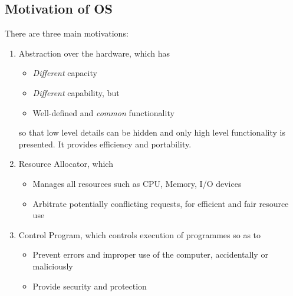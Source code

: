 \documentclass[11pt]{article}
\theoremstyle{definition}
\begin{document}
\subsection{Motivation of OS}
There are three main motivations:
\begin{enumerate}
  \item Abstraction over the hardware, which has
  \begin{itemize}[itemsep=0pt]
    \item \textit{Different} capacity
    \item \textit{Different} capability, but
    \item Well-defined and \textit{common} functionality
  \end{itemize}
  so that low level details can be hidden and only high level functionality is presented. It provides efficiency and portability.
  \item Resource Allocator, which 
  \begin{itemize}[itemsep=0pt]
    \item Manages all resources such as CPU, Memory, I/O devices
    \item Arbitrate potentially conflicting requests, for efficient and fair resource use
  \end{itemize}
  \item Control Program, which controls execution of programmes so as to 
  \begin{itemize}[itemsep=0pt]
    \item Prevent errors and improper use of the computer, accidentally or maliciously
    \item Provide security and protection
  \end{itemize}
\end{enumerate}
\end{document}

